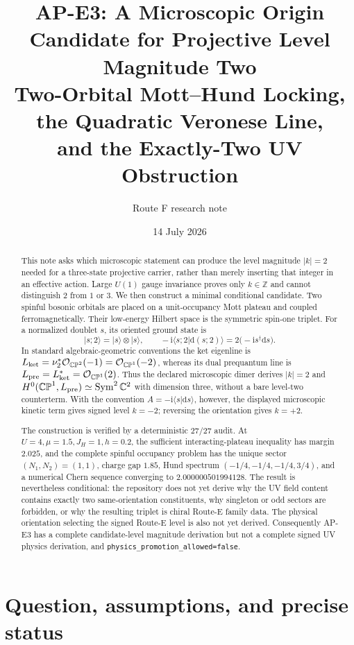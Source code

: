 \documentclass[11pt]{article}
\title{AP-E3: A Microscopic Origin Candidate for Projective Level Magnitude Two\\
Two-Orbital Mott--Hund Locking, the Quadratic Veronese Line,\\
and the Exactly-Two UV Obstruction}
\author{Route F research note}
\date{14 July 2026}
\theoremstyle{definition}
\theoremstyle{remark}
\newcommand{\CP}{\mathbb{CP}}
\newcommand{\CC}{\mathbb{C}}
\newcommand{\cO}{\mathcal O}
\newcommand{\ii}{\mathrm i}
\newcommand{\dd}{\mathrm d}
\newcommand{\Sym}{\operatorname{Sym}}
\newcommand{\ket}[1]{\lvert #1\rangle}
\newcommand{\braket}[2]{\langle #1\vert #2\rangle}
\newcommand{\nopromote}{\texttt{physics\_promotion\_allowed=false}}
\begin{document}
\maketitle

\begin{abstract}
This note asks which microscopic statement can produce the level magnitude
\(|k|=2\)
needed for a three-state projective carrier, rather than merely inserting that
integer in an effective action.  Large \(U(1)\) gauge invariance proves only
\(k\in\mathbb Z\) and cannot distinguish \(2\) from \(1\) or \(3\).  We then
construct a minimal conditional candidate.  Two spinful bosonic orbitals are
placed on a unit-occupancy Mott plateau and coupled ferromagnetically.  Their
low-energy Hilbert space is the symmetric spin-one triplet.  For a normalized
doublet \(s\), its oriented ground state is
\[
 \ket{s;2}=\ket{s}\otimes\ket{s},
 \qquad
 -\ii\braket{s;2}{\dd(s;2)}=2\bigl(-\ii s^\dagger\dd s\bigr).
\]
In standard algebraic-geometric conventions the ket eigenline is
\(L_{\rm ket}=\nu_2^*\cO_{\CP^2}(-1)=\cO_{\CP^1}(-2)\), whereas its dual
prequantum line is \(L_{\rm pre}=L_{\rm ket}^*=\cO_{\CP^1}(2)\).  Thus the
declared microscopic dimer derives \(|k|=2\) and
\(H^0(\CP^1,L_{\rm pre})\simeq\Sym^2\CC^2\) with dimension three, without a
bare level-two counterterm.  With the convention
\(A=-\ii\braket{s}{\dd s}\), however, the displayed microscopic kinetic term
gives signed level \(k=-2\); reversing the orientation gives \(k=+2\).

The construction is verified by a deterministic \(27/27\) audit.  At
\(U=4,\mu=1.5,J_H=1,h=0.2\), the sufficient interacting-plateau inequality
has margin \(2.025\), and the complete spinful occupancy problem has the
unique sector \((N_1,N_2)=(1,1)\), charge gap \(1.85\), Hund
spectrum \((-1/4,-1/4,-1/4,3/4)\), and a numerical Chern sequence converging
to \(2.000000501994128\).  The result is nevertheless conditional: the
repository does not yet derive why the UV field content contains exactly two
same-orientation constituents, why singleton or odd sectors are forbidden,
or why the resulting triplet is chiral Route-E family data.  The physical
orientation selecting the signed Route-E level is also not yet derived.
Consequently AP-E3 has a complete candidate-level magnitude derivation but
not a complete signed UV physics derivation, and \nopromote.
\end{abstract}
\tableofcontents

\section{Question, assumptions, and precise status}
\end{document}
